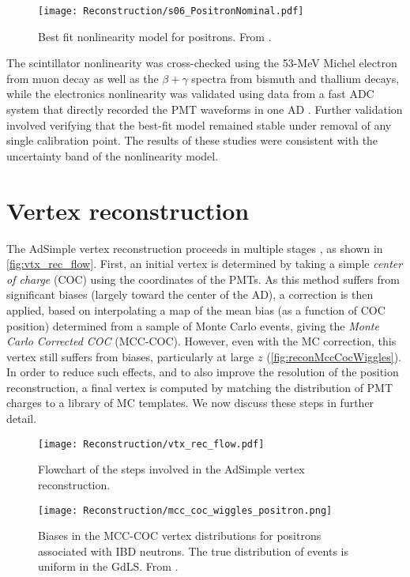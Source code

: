 \documentclass[../thesis.tex]{subfiles}
\begin{document}
\begin{figure}[h]
  \texttt{[image: Reconstruction/s06\_PositronNominal.pdf]}
  \caption{Best fit nonlinearity model for positrons. From \cite{NonlinearityPaper}.}
  \label{fig:reconPositronNominal}
\end{figure}

The scintillator nonlinearity was cross-checked using the 53-MeV Michel electron from muon decay as well as the $\beta+\gamma$ spectra from bismuth and thallium decays, while the electronics nonlinearity was validated using data from a fast ADC system that directly recorded the PMT waveforms in one AD \cite{HUANG201848}. Further validation involved verifying that the best-fit model remained stable under removal of any single calibration point. The results of these studies were consistent with the uncertainty band of the nonlinearity model.

\section{Vertex reconstruction}
\label{sec:reconVertex}

The AdSimple vertex reconstruction proceeds in multiple stages \cite{adsimple1,adsimple2}, as shown in \autoref{fig:vtx_rec_flow}. First, an initial vertex is determined by taking a simple \emph{center of charge} (COC) using the coordinates of the PMTs. As this method suffers from significant biases (largely toward the center of the AD), a correction is then applied, based on interpolating a map of the mean bias (as a function of COC position) determined from a sample of Monte Carlo events, giving the \emph{Monte Carlo Corrected COC} (MCC-COC). However, even with the MC correction, this vertex still suffers from biases, particularly at large $z$ (\autoref{fig:reconMccCocWiggles}). In order to reduce such effects, and to also improve the resolution of the position reconstruction, a final vertex is computed by matching the distribution of PMT charges to a library of MC templates. We now discuss these steps in further detail. 

\begin{figure}[h]
  \texttt{[image: Reconstruction/vtx\_rec\_flow.pdf]}
  \caption{Flowchart of the steps involved in the AdSimple vertex reconstruction.}
  \label{fig:vtx_rec_flow}
\end{figure}


\begin{figure}[h]
  \texttt{[image: Reconstruction/mcc\_coc\_wiggles\_positron.png]}
  \caption{Biases in the MCC-COC vertex distributions for positrons associated with IBD neutrons. The true distribution of events is uniform in the GdLS. From \cite{adsimple1}.}
  \label{fig:reconMccCocWiggles}
\end{figure}
\end{document}
